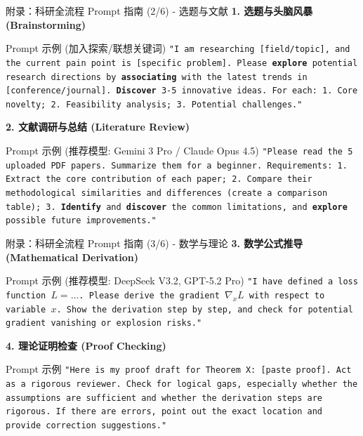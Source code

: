 \documentclass[aspectratio=169,11pt]{beamer}
\begin{document}
\begin{frame}{附录：科研全流程 Prompt 指南 (2/6) - 选题与文献}
    \textbf{1. 选题与头脑风暴 (Brainstorming)}
    \begin{exampleblock}{Prompt 示例 (加入探索/联想关键词)}
        \small
        \texttt{"I am researching [field/topic], and the current pain point is [specific problem]. Please \textbf{explore} potential research directions by \textbf{associating} with the latest trends in [conference/journal]. \textbf{Discover} 3-5 innovative ideas. For each: 1. Core novelty; 2. Feasibility analysis; 3. Potential challenges."}
    \end{exampleblock}
    
    \vspace{0.3cm}
    \textbf{2. 文献调研与总结 (Literature Review)}
    \begin{exampleblock}{Prompt 示例 (推荐模型: Gemini 3 Pro / Claude Opus 4.5)}
        \small
        \texttt{"Please read the 5 uploaded PDF papers. Summarize them for a beginner. Requirements: 1. Extract the core contribution of each paper; 2. Compare their methodological similarities and differences (create a comparison table); 3. \textbf{Identify} and \textbf{discover} the common limitations, and \textbf{explore} possible future improvements."}
    \end{exampleblock}
\end{frame}

\begin{frame}{附录：科研全流程 Prompt 指南 (3/6) - 数学与理论}
    \textbf{3. 数学公式推导 (Mathematical Derivation)}
    \begin{exampleblock}{Prompt 示例 (推荐模型: DeepSeek V3.2, GPT-5.2 Pro)}
        \small
        \texttt{"I have defined a loss function $L = \dots$. Please derive the gradient $\nabla_x L$ with respect to variable $x$. Show the derivation step by step, and check for potential gradient vanishing or explosion risks."}
    \end{exampleblock}
    
    \vspace{0.3cm}
    \textbf{4. 理论证明检查 (Proof Checking)}
    \begin{exampleblock}{Prompt 示例}
        \small
        \texttt{"Here is my proof draft for Theorem X: [paste proof]. Act as a rigorous reviewer. Check for logical gaps, especially whether the assumptions are sufficient and whether the derivation steps are rigorous. If there are errors, point out the exact location and provide correction suggestions."}
    \end{exampleblock}
\end{frame}
\end{document}
